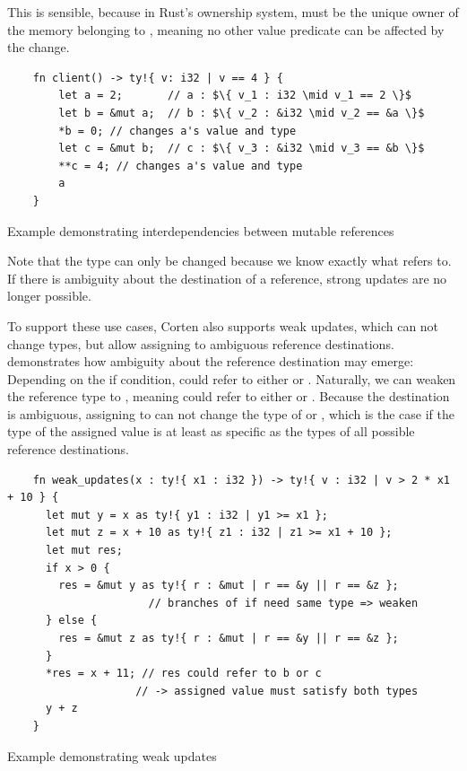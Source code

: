 \documentclass[twoside, english]{sdqthesis}
\theoremstyle{definition}
\begin{document}
This is sensible, because in Rust's ownership system,  must be the unique owner of the memory belonging to , meaning no other value predicate can be affected by the change.

\begin{listing}[ht]
  \begin{verbatim}
    fn client() -> ty!{ v: i32 | v == 4 } {
        let a = 2;       // a : $\{ v_1 : i32 \mid v_1 == 2 \}$
        let b = &mut a;  // b : $\{ v_2 : &i32 \mid v_2 == &a \}$
        *b = 0; // changes a's value and type
        let c = &mut b;  // c : $\{ v_3 : &i32 \mid v_3 == &b \}$
        **c = 4; // changes a's value and type
        a
    }
  \end{verbatim}
  \caption{Example demonstrating interdependencies between mutable references}
  \label{lst:mutation-strong}
\end{listing}

Note that the type can only be changed because we know exactly what  refers to. If there is ambiguity about the destination of a reference, strong updates are no longer possible.

To support these use cases, Corten also supports weak updates, which can not change types, but allow assigning to ambiguous reference destinations.
 demonstrates how ambiguity about the reference destination may emerge: Depending on the if condition,  could refer to either  or .
Naturally, we can weaken the reference type to , meaning  could refer to either  or .
Because the destination is ambiguous, assigning to  can not change the type of  or , which is the case if the type of the assigned value is at least as specific as the types of all possible reference destinations.

\begin{listing}[ht]
  \begin{verbatim}
    fn weak_updates(x : ty!{ x1 : i32 }) -> ty!{ v : i32 | v > 2 * x1 + 10 } {
      let mut y = x as ty!{ y1 : i32 | y1 >= x1 };
      let mut z = x + 10 as ty!{ z1 : i32 | z1 >= x1 + 10 };
      let mut res;
      if x > 0 {
        res = &mut y as ty!{ r : &mut | r == &y || r == &z };
                      // branches of if need same type => weaken
      } else {
        res = &mut z as ty!{ r : &mut | r == &y || r == &z };
      }
      *res = x + 11; // res could refer to b or c 
                    // -> assigned value must satisfy both types
      y + z
    }
  \end{verbatim}
  \caption{Example demonstrating weak updates}
  \label{lst:mutation-weak}
\end{listing}
\end{document}
